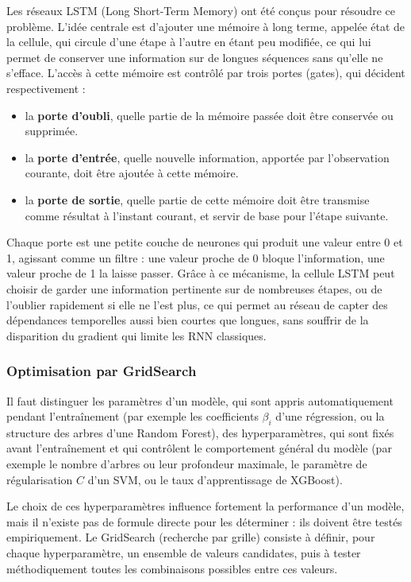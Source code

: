 \documentclass[a4paper,12pt, oneside]{article}
\begin{document}
Les réseaux LSTM (Long Short-Term Memory) ont été conçus pour résoudre ce problème. L'idée centrale est d'ajouter une mémoire à long terme, appelée état de la cellule, qui circule d'une étape à l'autre en étant peu modifiée, ce qui lui permet de conserver une information sur de longues séquences sans qu'elle ne s'efface. L'accès à cette mémoire est contrôlé par trois portes (gates), qui décident respectivement :
\begin{itemize}
\item la \textbf{porte d'oubli}, quelle partie de la mémoire passée doit être conservée ou supprimée.
\item la \textbf{porte d'entrée}, quelle nouvelle information, apportée par l'observation courante, doit être ajoutée à cette mémoire.
\item la \textbf{porte de sortie}, quelle partie de cette mémoire doit être transmise comme résultat à l'instant courant, et servir de base pour l'étape suivante.
\end{itemize}

Chaque porte est une petite couche de neurones qui produit une valeur entre 0 et 1, agissant comme un filtre : une valeur proche de 0 bloque l'information, une valeur proche de 1 la laisse passer. Grâce à ce mécanisme, la cellule LSTM peut choisir de garder une information pertinente sur de nombreuses étapes, ou de l'oublier rapidement si elle ne l'est plus, ce qui permet au réseau de capter des dépendances temporelles aussi bien courtes que longues, sans souffrir de la disparition du gradient qui limite les RNN classiques.

\subsubsection{Optimisation par GridSearch}

Il faut distinguer les paramètres d'un modèle, qui sont appris automatiquement pendant l'entraînement (par exemple les coefficients $\beta_i$ d'une régression, ou la structure des arbres d'une Random Forest), des hyperparamètres, qui sont fixés avant l'entraînement et qui contrôlent le comportement général du modèle (par exemple le nombre d'arbres ou leur profondeur maximale, le paramètre de régularisation $C$ d'un SVM, ou le taux d'apprentissage de XGBoost).

Le choix de ces hyperparamètres influence fortement la performance d'un modèle, mais il n'existe pas de formule directe pour les déterminer : ils doivent être testés empiriquement. Le GridSearch (recherche par grille) consiste à définir, pour chaque hyperparamètre, un ensemble de valeurs candidates, puis à tester méthodiquement toutes les combinaisons possibles entre ces valeurs.
\end{document}
